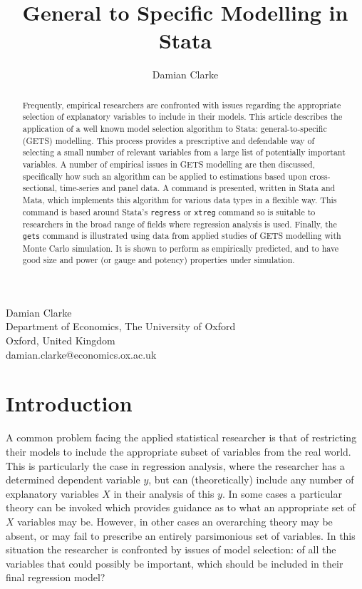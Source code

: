 \documentclass[bib]{statapress}
\begin{document}
\author{Damian Clarke}{%
  Damian Clarke\\Department of Economics, The University of Oxford\\Oxford,
  United Kingdom\\damian.clarke@economics.ox.ac.uk
}
\title[A gets Algorithm in Stata]{General to Specific Modelling in Stata}


\maketitle
\begin{abstract}
 Frequently, empirical researchers are confronted with issues regarding the 
 appropriate selection of explanatory variables to include in their models.
 This article describes the application of a well known model selection 
 algorithm to Stata: general-to-specific (GETS) modelling.  This process 
 provides a prescriptive and defendable way of selecting a small number of
 relevant variables from a large list of potentially important variables.
 A number of empirical issues in GETS modelling are then discussed, 
 specifically how such an algorithm can be applied to estimations based upon 
 cross-sectional, time-series and panel data.  A command is presented, written 
 in Stata and Mata, which implements this algorithm for various data types in a
 flexible way.  This command is based around Stata's \texttt{regress} or 
 \texttt{xtreg} command so is suitable to researchers in the broad range of 
 fields where regression analysis is used.  Finally, the \texttt{gets} command
 is illustrated using data from applied studies of GETS modelling with Monte 
 Carlo simulation.  It is shown to perform as empirically predicted, and to 
 have good size and power (or gauge and potency) properties under simulation.
\end{abstract}

\section{Introduction}
A common problem facing the applied statistical researcher is that of 
restricting their models to include the appropriate subset of variables from 
the real world.  This is particularly the case in regression analysis, where
the researcher has a determined dependent variable $y$, but can (theoretically)
include any number of explanatory variables $X$ in their analysis of this $y$.
In some cases a particular theory can be invoked which provides guidance as to 
what an appropriate set of $X$ variables may be.  However, in other cases an 
overarching theory may be absent, or may fail to prescribe an entirely 
parsimonious set of variables.  In this situation the researcher is confronted 
by issues of model selection: of all the variables that could possibly be
important, which should be included in their final regression model?
\end{document}
